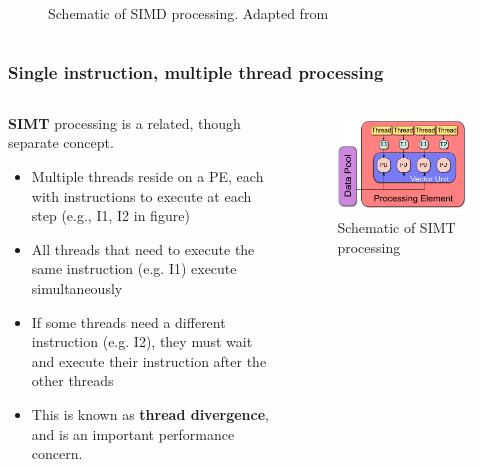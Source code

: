 \documentclass{beamer}
\newcounter{dummynote1}%
\newcounter{dummynote2}%
\begin{document}
\begin{frame}
\begin{columns}
\begin{column}{0.4\textwidth}
\begin{figure}
    \caption{Schematic of SIMD processing.  Adapted from\footnotemark[\value{dummynote1}]}
  \end{figure}
 \end{column}
 \end{columns}
 \setcounter{footnote}{\value{dummynote1}}
\end{frame}

\begin{frame}
 \frametitle{Single instruction, multiple thread processing}
 \begin{columns}
 \begin{column}{0.6\textwidth}
 \textbf{SIMT} processing is a related, though separate concept.
 \begin{itemize}
  \item Multiple threads reside on a PE, each with instructions to execute at each step (e.g., \textrm{I1}, \textrm{I2} in figure)
  \item All threads that need to execute the same instruction (e.g. \textrm{I1}) execute simultaneously
  \item If some threads need a different instruction (e.g. \textrm{I2}), they must wait and execute their instruction after the other threads
  \item This is known as \textbf{thread divergence}, and is an important performance concern.
 \end{itemize}
 \end{column}
 \begin{column}{0.4\textwidth}
  \begin{figure}[r]
    \centering
    \includegraphics[width=\columnwidth]{SIMT.pdf}
    \caption{Schematic of SIMT processing}
  \end{figure}
 \end{column}
 \end{columns}
\end{frame}
\end{document}
